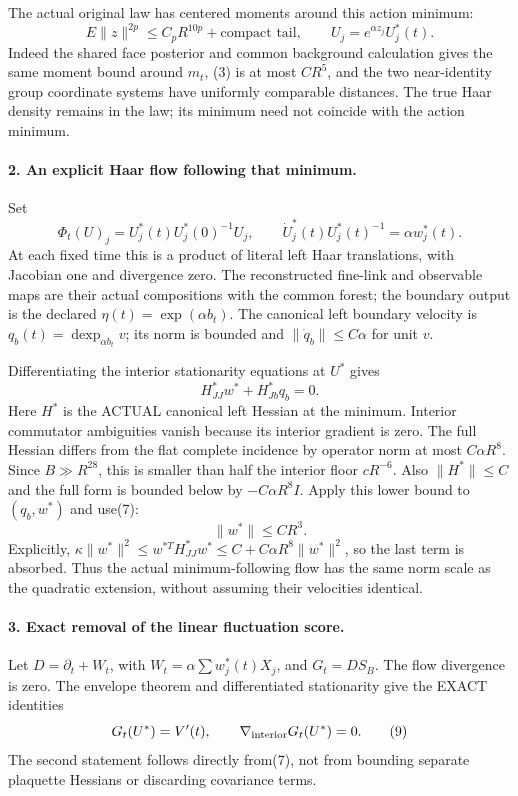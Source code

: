 \documentclass[11pt]{article}
\begin{document}
The actual original law has centered moments around this action minimum:
\[
 E\|z\|^{2p}\le C_pR^{10p}+\text{compact tail},\qquad
 U_j=e^{\alpha z_j}U_j^*(t).                                            \tag{5}
\]
Indeed the shared face posterior and common background calculation gives the same moment bound around $m_t$, (3) is at most $CR^5$,
and the two near-identity group coordinate systems have uniformly comparable
distances. The true Haar density remains in the law; its minimum need not
coincide with the action minimum.

\paragraph{2. An explicit Haar flow following that minimum.}
Set
\[
 \Phi_t(U)_j=U_j^*(t)U_j^*(0)^{-1}U_j,\qquad
 \dot U_j^*(t)U_j^*(t)^{-1}=\alpha w_j^*(t).                             \tag{6}
\]
At each fixed time this is a product of literal left Haar translations,
with Jacobian one and divergence zero. The reconstructed fine-link and
observable maps are their actual compositions with the common forest; the
boundary output is the declared $\eta(t)=\exp(\alpha b_t)$.
The canonical left boundary velocity is
$q_b(t)=\operatorname{dexp}_{\alpha b_t}v$; its norm is bounded and
$\|\dot q_b\|\le C\alpha$ for unit $v$.

Differentiating the interior stationarity equations at $U^*$ gives
\[
 H^*_{JJ}w^*+H^*_{Jb}q_b=0.                                             \tag{7}
\]
Here $H^*$ is the ACTUAL canonical left Hessian at the minimum. Interior
commutator ambiguities vanish because its interior gradient is zero.
The full Hessian differs from the flat complete incidence by operator norm
at most $C\alpha R^8$. Since $B\gg R^{28}$, this is smaller than half the
interior floor $cR^{-6}$. Also $\|H^*\|\le C$ and the full form is bounded
below by $-C\alpha R^8 I$. Apply this lower bound to $(q_b,w^*)$ and use(7):
\[
 \|w^*\|\le CR^3.                                                      \tag{8}
\]
Explicitly, $\kappa\|w^*\|^2\le w^{*T}H^*_{JJ}w^*
\le C+C\alpha R^8\|w^*\|^2$, so the last term is absorbed. Thus the actual
minimum-following flow has the same norm scale as the quadratic extension,
without assuming their velocities identical.

\paragraph{3. Exact removal of the linear fluctuation score.}
Let $D=\partial_t+W_t$, with $W_t=\alpha\sum w_j^*(t)X_j$, and $G_t=DS_B$.
The flow divergence is zero. The envelope theorem and differentiated
stationarity give the EXACT identities
\[
 G_t(U^*)=V'(t),\qquad \nabla_{\rm interior}G_t(U^*)=0.                  \tag{9}
\]
The second statement follows directly from(7), not from bounding separate
plaquette Hessians or discarding covariance terms.
\end{document}
